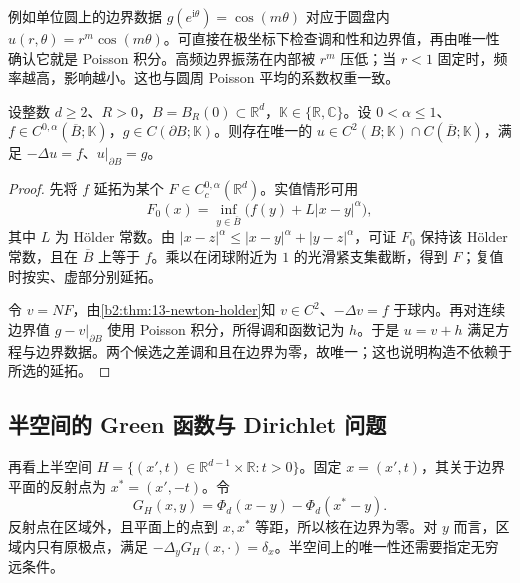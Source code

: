 例如单位圆上的边界数据 \(g(e^{\mathrm{i}\theta})=\cos(m\theta)\) 对应于圆盘内 \(u(r,\theta)=r^m\cos(m\theta)\)。可直接在极坐标下检查调和性和边界值，再由唯一性确认它就是 Poisson 积分。高频边界振荡在内部被 \(r^m\) 压低；当 \(r<1\) 固定时，频率越高，影响越小。这也与圆周 Poisson 平均的系数权重一致。

\begin{corollary}\label{b2:cor:13-ball-poisson-problem}
设整数 \(d\geq2\)、\(R>0\)，\(B=B_R(0)\subset\mathbb R^d\)，\(\mathbb K\in\{\mathbb R,\mathbb C\}\)。设 \(0<\alpha\leq1\)、\(f\in C^{0,\alpha}(\overline B;\mathbb K)\)，\(g\in C(\partial B;\mathbb K)\)。则存在唯一的 \(u\in C^2(B;\mathbb K)\cap C(\overline B;\mathbb K)\)，满足 \(-\Delta u=f\)、\(u|_{\partial B}=g\)。
\end{corollary}
\begin{proof}
先将 \(f\) 延拓为某个 \(F\in C_c^{0,\alpha}(\mathbb R^d)\)。实值情形可用
\[
 F_0(x)=\inf_{y\in\overline B}\bigl(f(y)+L|x-y|^\alpha\bigr),
\]
其中 \(L\) 为 Hölder 常数。由 \(|x-z|^\alpha\leq|x-y|^\alpha+|y-z|^\alpha\)，可证 \(F_0\) 保持该 Hölder 常数，且在 \(\overline B\) 上等于 \(f\)。乘以在闭球附近为 \(1\) 的光滑紧支集截断，得到 \(F\)；复值时按实、虚部分别延拓。

令 \(v=NF\)，由\cref{b2:thm:13-newton-holder}知 \(v\in C^2\)、\(-\Delta v=f\) 于球内。再对连续边界值 \(g-v|_{\partial B}\) 使用 Poisson 积分，所得调和函数记为 \(h\)。于是 \(u=v+h\) 满足方程与边界数据。两个候选之差调和且在边界为零，故唯一；这也说明构造不依赖于所选的延拓。
\end{proof}


\subsection{半空间的 Green 函数与 Dirichlet 问题}
\label{b2:subsec:13-halfspace-boundary}

再看上半空间 \(H=\{(x',t)\in\mathbb R^{d-1}\times\mathbb R:t>0\}\)。固定 \(x=(x',t)\)，其关于边界平面的反射点为 \(x^*=(x',-t)\)。令
\[
 G_H(x,y)=\Phi_d(x-y)-\Phi_d(x^*-y).
\]
反射点在区域外，且平面上的点到 \(x,x^*\) 等距，所以核在边界为零。对 \(y\) 而言，区域内只有原极点，满足 \(-\Delta_yG_H(x,\cdot)=\delta_x\)。半空间上的唯一性还需要指定无穷远条件。

